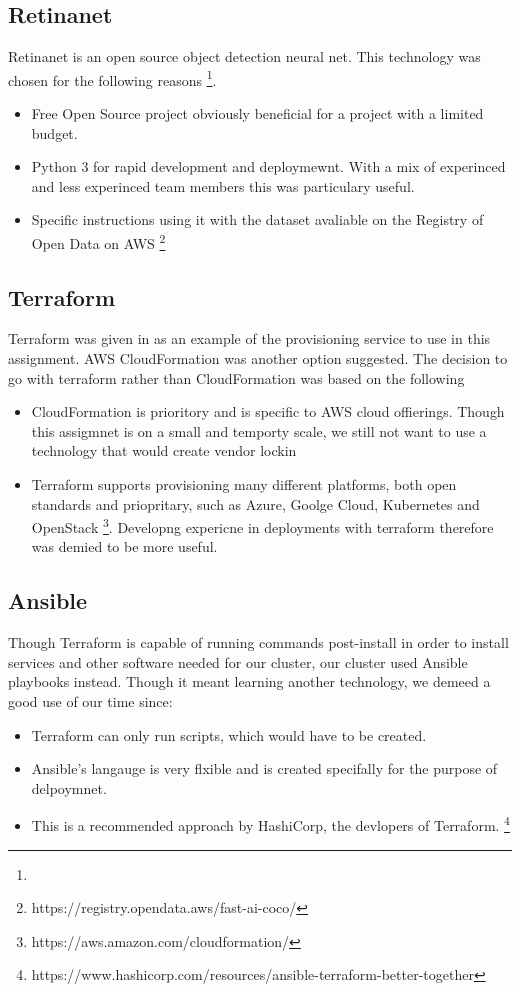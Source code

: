 \documentclass[conference]{IEEEtran}
\begin{document}
\subsection{Retinanet}
Retinanet is an open source object detection neural net. This technology was chosen for the following reasons \footnote{}.
\begin{itemize}
\item Free Open Source project obviously beneficial for a project with a limited budget.
\item Python 3 for rapid development and deploymewnt. With a mix of experinced and less experinced team members this was particulary useful.
\item Specific instructions using it with the dataset avaliable on the Registry of Open Data on AWS \footnote{https://registry.opendata.aws/fast-ai-coco/}
\end{itemize}
\subsection{Terraform}
Terraform was given in as an example of the provisioning service to use in this assignment. AWS CloudFormation was another option suggested. The decision to go with terraform rather than CloudFormation was based on the following
\begin{itemize}
  \item CloudFormation is prioritory and is specific to AWS cloud offierings. Though this assigmnet is on a small and temporty scale, we still not want to use a technology that would create vendor lockin
  \item Terraform supports provisioning many different platforms, both open standards and priopritary, such as Azure, Goolge Cloud, Kubernetes and OpenStack \footnote{https://aws.amazon.com/cloudformation/}. Developng expericne in deployments with terraform therefore was demied to be more useful.
\end{itemize}
\subsection{Ansible}
Though Terraform is capable of running commands post-install in order to install services and other software needed for our cluster, our cluster used Ansible playbooks instead. Though it meant learning another technology, we demeed a good use of our time since:
\begin{itemize}
  \item Terraform can only run scripts, which would have to be created.
  \item Ansible's langauge is very flxible and is created specifally for the purpose of delpoymnet.
  \item This is a recommended approach by HashiCorp, the devlopers of Terraform. \footnote{https://www.hashicorp.com/resources/ansible-terraform-better-together}
\end{itemize}
\end{document}

